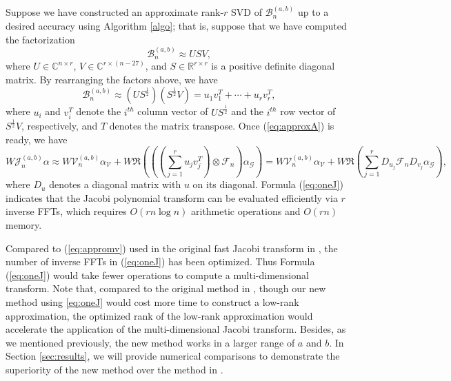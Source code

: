 \documentclass[11pt]{article}
\newcommand{\bbC}{\mathbb{C}}
\newcommand{\bbR}{\mathbb{R}}
\begin{document}
Suppose we have constructed an approximate rank-$r$ SVD of $\mathcal{B}_{n}^{(a,b)}$ up to a desired accuracy using Algorithm \ref{algo}; that is, 
suppose that we have computed the factorization
\begin{equation}
\mathcal{B}_{n}^{(a,b)} \approx USV,
\end{equation}
where $U\in \bbC^{n\times r}$, $V\in \bbC^{r\times (n-27)}$, and $S\in \bbR^{r\times r}$ is a positive definite diagonal matrix. By rearranging the factors above, we have
\begin{equation}
\label{eq:approxA}
\mathcal{B}_{n}^{(a,b)} \approx (US^{\frac{1}{2}})(S^{\frac{1}{2}}V) = u_{1}v_{1}^{T}+\cdots+u_{r}v_{r}^{T},
\end{equation} 
where $u_{i}$ and $v_{i}^{T}$ denote the $i^{th}$ column vector of $US^{\frac{1}{2}}$ and the $i^{th}$ row vector of $S^{\frac{1}{2}}V$, respectively, and $T$ denotes the matrix transpose. Once (\ref{eq:approxA}) is ready, we have
\begin{equation}
\label{eq:oneJ}
W\mathcal{J}_{n}^{(a,b)}\alpha \approx W\mathcal{V}_n^{(a,b)} \alpha_{\mathcal{V}} + W\Re(((\sum\limits_{j=1}^{r}u_{j}v_{j}^T)\otimes \mathcal{F}_{n}) \alpha_{\mathcal{G}}) =W\mathcal{V}_n^{(a,b)} \alpha_{\mathcal{V}} + W\Re(\sum\limits_{j=1}^{r}D_{u_{j}}\mathcal{F}_{n}D_{v_{j}}\alpha_{\mathcal{G}}),
\end{equation}
where $D_{u}$ denotes a diagonal matrix with $u$ on its diagonal. Formula (\ref{eq:oneJ}) indicates that the Jacobi polynomial transform can be evaluated efficiently via $r$ inverse FFTs, which requires $O(rn\log n)$ arithmetic operations and $O(rn)$ memory. {} 

 Compared to (\ref{eq:appromv}) used in the original fast Jacobi transform in \cite{Jacobi}, the number of inverse FFTs in (\ref{eq:oneJ}) has been optimized. Thus Formula (\ref{eq:oneJ}) would take fewer operations to compute a multi-dimensional transform. Note that, compared to the original method in \cite{Jacobi}, though our new method using \eqref{eq:oneJ} would cost more time to construct a low-rank approximation, the optimized rank of the low-rank approximation would accelerate the application of the multi-dimensional Jacobi transform. Besides, as we mentioned previously, the new method works in a larger range of $a$ and $b$. In Section \ref{sec:results}, we will provide numerical comparisons to demonstrate the superiority of the new method over the method in \cite{Jacobi}. 
\end{document}
